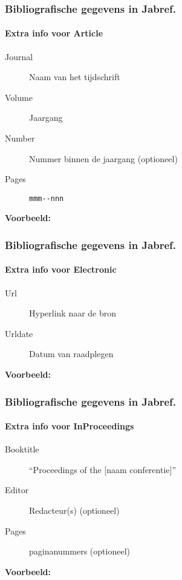 \documentclass[aspectratio=169]{beamer}
\begin{document}
\begin{frame}[fragile]
  \frametitle{Bibliografische gegevens in Jabref.}
  \framesubtitle{Extra info voor Article}

  \begin{description}
    \item[Journal] Naam van het tijdschrift
    \item[Volume] Jaargang
    \item[Number] Nummer binnen de jaargang (optioneel)
    \item[Pages] \verb|mmm--nnn|
  \end{description}

  \bigskip

  \textbf{Voorbeeld:}

  \bigskip

\end{frame}

\begin{frame}[plain]
  \frametitle{Bibliografische gegevens in Jabref.}
  \framesubtitle{Extra info voor Electronic}

  \begin{description}
    \item[Url] Hyperlink naar de bron
    \item[Urldate] Datum van raadplegen
  \end{description}

  \bigskip

  \textbf{Voorbeeld:}

  \bigskip


\end{frame}

\begin{frame}[plain]
  \frametitle{Bibliografische gegevens in Jabref.}
  \framesubtitle{Extra info voor InProceedings}

  \begin{description}
    \item[Booktitle] ``Proceedings of the [naam conferentie]''
    \item[Editor] Redacteur(s) (optioneel)
    \item[Pages] paginanummers (optioneel)
  \end{description}

  \medskip

  \textbf{Voorbeeld:}

\end{frame}
\end{document}
